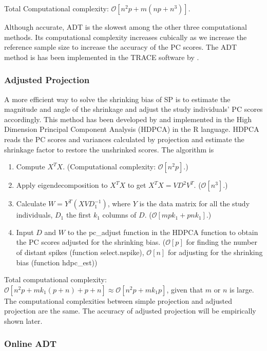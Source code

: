 \documentclass{article}
\newcommand{\bO}{\mathcal{O}}
\begin{document}
Total Computational complexity: $\bO[n^2p + m(np + n^3)]$.

Although accurate, ADT is the slowest among the other three computational
methods.
Its computational complexity increases cubically as we increase the reference sample size to increase the accuracy of the PC scores.
The ADT method is has been implemented in the TRACE software by \cite{wang}.


\subsubsection{Adjusted Projection}

A more efficient way to solve the shrinking bias of SP is to estimate the
magnitude and angle of the shrinkage and adjust the study individuals' PC scores accordingly.
This method has been developed by \cite{dey} and implemented in the High
Dimension Principal Component Analysis (HDPCA) in the R language.
HDPCA reads the PC scores and variances calculated by projection and estimate the shrinkage factor to restore the unshrinked scores. 
The algorithm is
\begin{enumerate}
\item Compute $X^T X$.
  (Computational complexity: $\bO[n^2p]$.)  
\item Apply eigendecomposition to $X^T X$ to get $X^T X = V D^2 V^T$.
  ($\bO[n^3]$.)
\item Calculate $W = Y^T (X V D_1^{-1})$, where $Y$ is the data matrix for all the study individuals, $D_1$ the first $k_1$ columns of $D$. ($\bO[mpk_1 + pnk_1]$.)
  \item Input $D$ and $W$ to the pc\_adjust function in the HDPCA function to obtain the PC scores adjusted for the shrinking bias. ($\bO[p]$ for finding the number of distant spikes (function select.nspike), $\bO[n]$ for adjusting for the shrinking bias (function hdpc\_est))
\end{enumerate}

Total computational complexity: $\bO[n^2p + mk_1(p + n) + p + n] \approx \bO[n^2p + mk_1p]$,
given that $m$ or $n$ is large. The computational complexities between simple projection and adjusted projection are the same.
The accuracy of adjusted projection will be empirically shown later.

\subsubsection{Online ADT}
\end{document}
